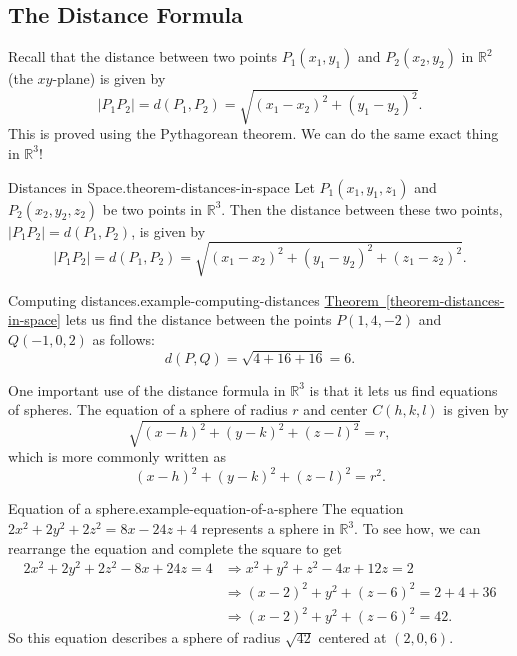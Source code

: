 \documentclass[10pt,]{book}
\numberwithin{equation}{section}
\newcommand{\RR}{\mathbb{R}}
\begin{document}
\subsection[{The Distance Formula}]{The Distance Formula}\label{subsection-the-distance-formula}
\hypertarget{p-1073}{}%
Recall that the distance between two points \(P_{1}(x_{1},y_{1})\) and \(P_{2}(x_{2},y_{2})\) in \(\RR^{2}\) (the \(xy\)-plane) is given by%
%
\begin{equation*}
|P_{1}P_{2}| = d(P_{1},P_{2}) = \sqrt{(x_{1}-x_{2})^{2}+(y_{1}-y_{2})^{2}}.
\end{equation*}
\hypertarget{p-1074}{}%
This is proved using the Pythagorean theorem. We can do the same exact thing in \(\RR^{3}\)!%
\begin{theorem}{Distances in Space.}{}{theorem-distances-in-space}%
\hypertarget{p-1075}{}%
Let \(P_{1}(x_{1},y_{1},z_{1})\) and \(P_{2}(x_{2},y_{2},z_{2})\) be two points in \(\RR^{3}\). Then the distance between these two points, \(|P_{1}P_{2}| = d(P_{1},P_{2})\), is given by%
\begin{equation*}
|P_{1}P_{2}| = d(P_{1},P_{2}) = \sqrt{(x_{1}-x_{2})^{2}+(y_{1}-y_{2})^{2} + (z_{1}-z_{2})^{2}}.
\end{equation*}
%
\end{theorem}
\begin{example}{Computing distances.}{example-computing-distances}%
\hypertarget{p-1076}{}%
\hyperref[theorem-distances-in-space]{Theorem~\ref{theorem-distances-in-space}} lets us find the distance between the points \(P(1,4,-2)\) and \(Q(-1,0,2)\) as follows:%
%
\begin{equation*}
d(P,Q) = \sqrt{4+16+16} = 6.
\end{equation*}
\end{example}
\hypertarget{p-1077}{}%
One important use of the distance formula in \(\RR^{3}\) is that it lets us find equations of spheres. The equation of a sphere of radius \(r\) and center \(C(h,k,l)\) is given by%
\begin{equation*}
\sqrt{(x-h)^{2}+(y-k)^{2}+(z-l)^{2}} = r,
\end{equation*}
which is more commonly written as%
\begin{equation*}
(x-h)^{2}+(y-k)^{2}+(z-l)^{2} = r^{2}.
\end{equation*}
%
\begin{example}{Equation of a sphere.}{example-equation-of-a-sphere}%
\hypertarget{p-1078}{}%
The equation \(2x^{2}+2y^{2}+2z^{2} = 8x - 24z + 4\) represents a sphere in \(\RR^{3}\). To see how, we can rearrange the equation and complete the square to get%
%
\begin{align*}
2x^{2}+2y^{2}+2z^{2} - 8x + 24z = 4 & \Rightarrow x^{2}+y^{2}+z^{2} - 4x + 12z = 2 \\
& \Rightarrow (x-2)^{2} + y^{2} + (z-6)^{2} = 2 + 4 + 36\\
& \Rightarrow (x-2)^{2} + y^{2} + (z-6)^{2} = 42.
\end{align*}
\hypertarget{p-1079}{}%
So this equation describes a sphere of radius \(\sqrt{42}\) centered at \((2,0,6)\).%
\end{example}
\end{document}
